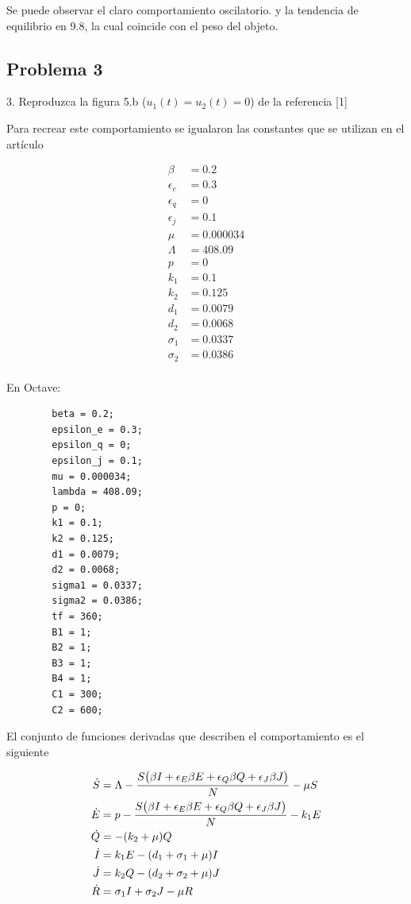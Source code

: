 \documentclass[a4paper, 12pt]{article}
\begin{document}
    Se puede observar el claro comportamiento oscilatorio. y la tendencia de equilibrio en 9.8, la cual coincide con el peso del objeto.

    \subsection{Problema 3}

    3. Reproduzca la figura 5.b ($u_1(t) = u_2(t) = 0$) de la referencia [1]

    Para recrear este comportamiento se igualaron las constantes que se utilizan en el artículo

    \begin{align*}
        \beta &= 0.2 \\
        \epsilon_e &= 0.3 \\
        \epsilon_q &= 0 \\ 
        \epsilon_j &= 0.1 \\
        \mu &= 0.000034 \\
        \Lambda &= 408.09 \\
        p &= 0 \\
        k_1 &= 0.1\\
        k_2 &= 0.125\\
        d_1 &= 0.0079\\
        d_2 &= 0.0068 \\
        \sigma_1 &= 0.0337 \\
        \sigma_2 &= 0.0386 \\
    \end{align*}

    En Octave:

    \begin{verbatim}
        beta = 0.2;
        epsilon_e = 0.3;
        epsilon_q = 0;
        epsilon_j = 0.1;
        mu = 0.000034;
        lambda = 408.09;
        p = 0;
        k1 = 0.1;
        k2 = 0.125;
        d1 = 0.0079;
        d2 = 0.0068;
        sigma1 = 0.0337;
        sigma2 = 0.0386;
        tf = 360;
        B1 = 1;
        B2 = 1;
        B3 = 1;
        B4 = 1;
        C1 = 300;
        C2 = 600;
    \end{verbatim}

    El conjunto de funciones derivadas que describen el comportamiento es el siguiente

    \begin{align*}
        \dot{S} &= \Lambda - \frac{S\qty(\beta I + \epsilon_E \beta E + \epsilon_Q \beta Q + \epsilon_J \beta J)}{N} - \mu S \\
        \dot{E} &= p - \frac{S\qty(\beta I + \epsilon_E \beta E + \epsilon_Q \beta Q + \epsilon_J \beta J)}{N} - k_1 E \\
        \dot{Q} &= -(k_2 + \mu) Q \\
        \dot{I} &= k_1 E - \qty(d_1 + \sigma_1 + \mu) I \\
        \dot{J} &= k_2 Q - \qty(d_2 + \sigma_2 + \mu) J \\
        \dot{R} &= \sigma_1 I + \sigma_2 J - \mu R
    \end{align*}
\end{document}
